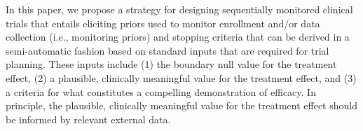 \documentclass[12pt]{article}
\begin{document}
%
%

In this paper, we propose a strategy for designing sequentially monitored clinical trials that entails eliciting 
priors used to monitor enrollment and/or data collection (i.e., monitoring priors) and stopping criteria that can 
be derived in a semi-automatic fashion based on standard inputs that are required for trial planning. 
%
These inputs include (1) the boundary null value for the treatment effect, (2) a plausible, clinically meaningful 
value for the treatment effect, and (3) a criteria for what constitutes a compelling demonstration of efficacy. 
%
In principle, the plausible, clinically meaningful value for the treatment effect should be informed by relevant external data. 
\end{document}
